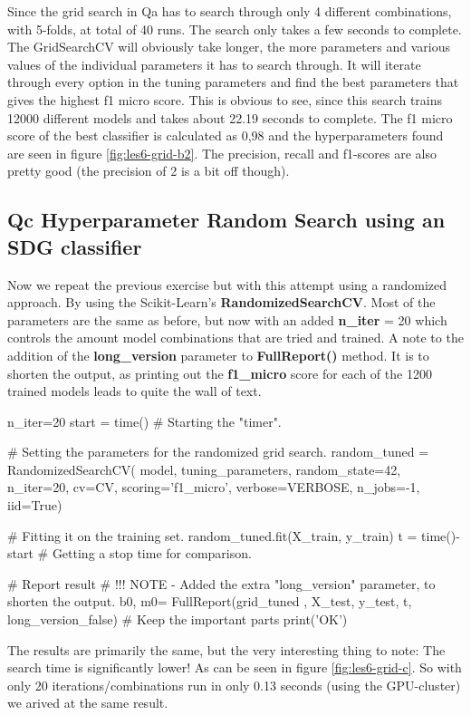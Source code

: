 \documentclass{article}
\begin{document}
\noindent
Since the grid search in Qa has to search through only 4 different combinations, with 5-folds, at total of 40 runs. The search only takes a few seconds to complete. The GridSearchCV will obviously take longer, the more parameters and various values of the individual parameters it has to search through. It will iterate through every option in the tuning parameters and find the best parameters that gives the highest f1 micro score. This is obvious to see, since this search trains 12000 different models and takes about 22.19 seconds to complete. The f1 micro score of the best classifier is calculated as 0,98 and the hyperparameters found are seen in figure \ref{fig:les6-grid-b2}. The precision, recall and f1-scores are also pretty good (the precision of 2 is a bit off though).

\subsection{Qc Hyperparameter Random Search using an SDG classifier}

Now we repeat the previous exercise but with this attempt using a randomized approach.
By using the Scikit-Learn's \textbf{RandomizedSearchCV}.
Most of the parameters are the same as before, but now with an added \textbf{n\_iter} = 20 which controls the amount model combinations that are tried and trained. A note to the addition of the \textbf{long\_version} parameter to \textbf{FullReport()} method. It is to shorten the output, as printing out the \textbf{f1\_micro} score for each of the 1200 trained models leads to quite the wall of text.

\begin{pyminted}
n_iter=20
start = time() # Starting the "timer".

# Setting the parameters for the randomized grid search.
random_tuned = RandomizedSearchCV(
    model, tuning_parameters, random_state=42, n_iter=20, cv=CV,
    scoring='f1_micro', verbose=VERBOSE, n_jobs=-1, iid=True)

# Fitting it on the training set.
random_tuned.fit(X_train, y_train)
t = time()-start # Getting a stop time for comparison.

# Report result
# !!! NOTE - Added the extra "long_version" parameter, to shorten the output.
b0, m0= FullReport(grid_tuned , X_test, y_test, t, long_version_false) # Keep the important parts
print('OK')
\end{pyminted}


\noindent
The results are primarily the same, but the very interesting thing to note: The search time is significantly lower! As can be seen in figure \ref{fig:les6-grid-c}. So with only 20 iterations/combinations run in only 0.13 seconds (using the GPU-cluster) we arived at the same result.
\end{document}
